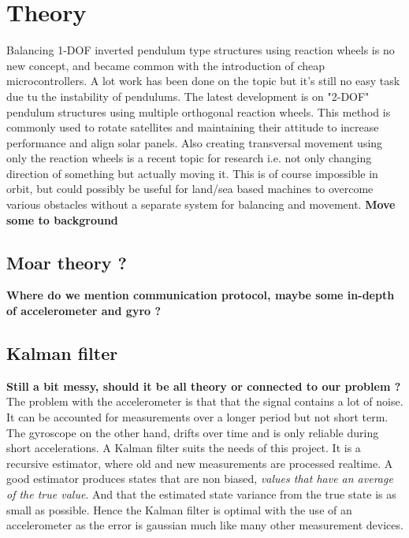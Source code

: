 \documentclass[a4paper,11pt]{kth-mag}
\begin{document}
\chapter{Theory}
Balancing 1-DOF inverted pendulum type structures using reaction wheels is no new concept, and became common with the introduction of cheap microcontrollers. A lot work has been done on the topic but it's still no easy task due tu the instability of pendulums. The latest development is on "2-DOF" pendulum structures using multiple orthogonal reaction wheels. This method is commonly used to rotate satellites and maintaining their attitude to increase performance and align solar panels. 
Also creating transversal movement using only the reaction wheels is a recent topic for research i.e. not only changing direction of something but actually moving it. This is of course impossible in orbit, but could possibly be useful for land/sea based machines to overcome various obstacles without a separate system for balancing and movement. \textbf{Move some to background}

\section{Moar theory ?}
\textbf{Where do we mention communication protocol, maybe some in-depth of accelerometer and gyro ? }


\section{Kalman filter}
\textbf{Still a bit messy, should it be all theory or connected to our problem ?}  \\
The problem with the accelerometer is that that the signal contains a lot of noise. It can be accounted for measurements over a longer period but not short term. The gyroscope on the other hand, drifts over time and is only reliable during short accelerations. 
A Kalman filter suits the needs of this project. It is a recursive estimator, where old and new measurements are processed realtime. 
A good estimator produces states that are non biased, \emph{values that have an average  of the true value}. And that the estimated state variance from the true state is as small as possible. Hence the Kalman filter is optimal with the use of an accelerometer as the error is gaussian much like many other measurement devices.  \cite{Simon2001}
\cite{Kalmanintro}
\end{document}
